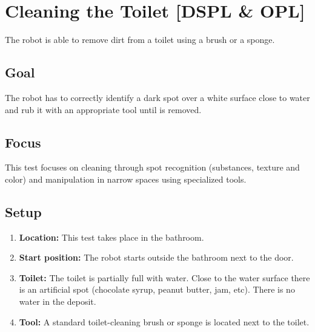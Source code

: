 \section{Cleaning the Toilet [DSPL \& OPL]}
The robot is able to remove dirt from a toilet using a brush or a sponge.

\subsection{Goal}
The robot has to correctly identify a dark spot over a white surface close to water and rub it with an appropriate tool until is removed.

\subsection{Focus}
This test focuses on cleaning through spot recognition (substances, texture and color) and manipulation in narrow spaces using specialized tools.

\subsection{Setup}
\begin{enumerate}

	\item \textbf{Location:} This test takes place in the bathroom. 
	\item \textbf{Start position:} The robot starts outside the bathroom next to the door.
	\item \textbf{Toilet:} The toilet is partially full with water. Close to the water surface there is an artificial spot (chocolate syrup, peanut butter, jam, etc). There is no water in the deposit.
	\item \textbf{Tool:} A standard toilet-cleaning brush or sponge is located next to the toilet.
\end{enumerate}


